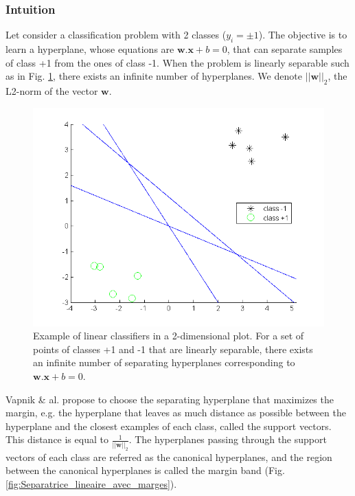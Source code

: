 \subsubsection{Intuition}
Let consider a classification problem with 2 classes ($y_i= \pm 1$). The objective is to learn a hyperplane, whose equations are $\textbf{w}. \textbf{x} + b = 0$, that can separate samples of class +1 from the ones of class -1. When the problem is linearly separable such as in Fig. \ref{fig:Plusieurs_separatrice_lineaire}, there exists an infinite number of hyperplanes. We denote $||\textbf{w}||_2$, the L2-norm of the vector $\textbf{w}$.

\begin{figure}[h!]
\centering
\includegraphics[width=0.6\linewidth]{images/Plusieurs_separatrice_lineaire2}
\caption{Example of linear classifiers in a 2-dimensional plot. For a set of points of classes +1 and -1 that are linearly separable, there exists an infinite number of separating hyperplanes corresponding to $\textbf{w}.\textbf{x} + b = 0.$}
\label{fig:Plusieurs_separatrice_lineaire}
\end{figure}

\noindent Vapnik \& al. \cite{Cortes1995} propose to choose the separating hyperplane that maximizes the margin, e.g. the hyperplane that leaves as much distance as possible between the hyperplane and the closest examples of each class, called the support vectors. This distance is equal to $\frac{1}{||\textbf{w}||_2}$. The hyperplanes passing through the support vectors of each class are referred as the canonical hyperplanes, and the region between the canonical hyperplanes is called the margin band (Fig. \ref{fig:Separatrice_lineaire_avec_marges}).

